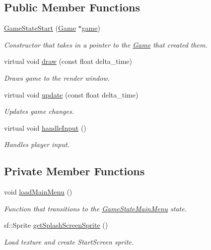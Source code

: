 \subsection*{Public Member Functions}
\begin{DoxyCompactItemize}
\item 
\hyperlink{class_game_state_start_a2477272c214e48d260bda72150c21ef8}{Game\+State\+Start} (\hyperlink{class_game}{Game} $\ast$\hyperlink{class_game_state_a355a79415b9ef63c2aec1448a99f6e71}{game})
\begin{DoxyCompactList}\small\item\em Constructor that takes in a pointer to the \hyperlink{class_game}{Game} that created them. \end{DoxyCompactList}\item 
virtual void \hyperlink{class_game_state_start_a0969e5227b6f2eaabd53ee69f32a37e7}{draw} (const float delta\+\_\+time)
\begin{DoxyCompactList}\small\item\em Draws game to the render window. \end{DoxyCompactList}\item 
virtual void \hyperlink{class_game_state_start_afbfe6831f8f9a14456840a98c7b5ef9c}{update} (const float delta\+\_\+time)
\begin{DoxyCompactList}\small\item\em Updates game changes. \end{DoxyCompactList}\item 
virtual void \hyperlink{class_game_state_start_afa9da08e1a51b4914ee436e7f1c4f6e6}{handle\+Input} ()
\begin{DoxyCompactList}\small\item\em Handles player input. \end{DoxyCompactList}\end{DoxyCompactItemize}
\subsection*{Private Member Functions}
\begin{DoxyCompactItemize}
\item 
void \hyperlink{class_game_state_start_abf9604839c31d8b48f3cdccb79f370e5}{load\+Main\+Menu} ()
\begin{DoxyCompactList}\small\item\em Function that transitions to the \hyperlink{class_game_state_main_menu}{Game\+State\+Main\+Menu} state. \end{DoxyCompactList}\item 
sf\+::\+Sprite \hyperlink{class_game_state_start_aca967324121e7e404a2f411102f186ac}{get\+Splash\+Screen\+Sprite} ()
\begin{DoxyCompactList}\small\item\em Load texture and create Start\+Screen sprite. \end{DoxyCompactList}\end{DoxyCompactItemize}
